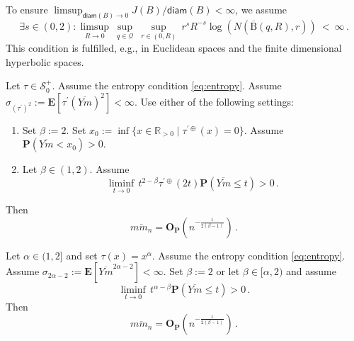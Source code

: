 \documentclass{article}
\newcommand*{\mc}[1]{\mathcal{#1}}
\newcommand{\R}{\mathbb{R}}
\newcommand{\Rpp}{\R_{>0}}
\newcommand{\ball}{\mathrm{B}}
\newcommand{\lb}{\left(} %
\newcommand{\rb}{\right)} %
\newcommand{\br}[1]{\lb #1 \rb} %
\newcommand{\brOf}[1]{\!\br{#1}} %
\renewcommand{\Pr}{\mathbf{P}} %
\newcommand{\Prof}[1]{\Pr(#1)}
\newcommand{\PrOf}[1]{\Pr\brOf{#1}}
\newcommand{\E}{\mathbf{E}} %
\newcommand{\Eof}[1]{\E[#1]}
\newcommand{\setByEleInText}[2]{\{#1 \mid #2\}}
\newcommand{\pr}{^\prime}
\newcommand{\eqfs}{\,.}
\newcommand{\ol}[2]{\overline{#1#2}}
\newcommand{\tran}{\tau}
\newcommand{\dtran}{\tau\pr}
\newcommand{\ddrtran}{\tau^{\prime\oplus}}
\newcommand{\setcciz}{\mc S_0^+}
\newcommand{\diam}{\mathsf{diam}}
\newcommand{\Op}{\mathbf{O}_{\Pr}}
\newcommand{\ballclosed}{\overline{\ball}}
\begin{document}
To ensure $\limsup_{\diam(B) \to 0}J(B)/\diam(B)<\infty$, we assume
\begin{equation}\label{eq:entropy}
    \exists s\in(0,2)\colon  
    \limsup_{R\to0} \ \sup_{q\in\mc Q} \ \sup_{r \in (0,R)} \  r^s R^{-s} \log\brOf{N(\ballclosed(q,R),r)} \ < \ \infty
    \eqfs
\end{equation}
This condition is fulfilled, e.g., in Euclidean spaces and the finite dimensional hyperbolic spaces.
%
\begin{theorem}\label{thm:fast:entropy}
    Let $\tran \in \setcciz$.
    Assume the entropy condition \eqref{eq:entropy}. 
    Assume $\sigma_{(\dtran)^2} := \Eof{\dtran(\ol Ym)^2} < \infty$.
    Use either of the following settings:
    \begin{enumerate}[label=(\roman*)]
        \item
        Set $\beta := 2$.
        Set $x_0 := \inf\setByEleInText{x\in\Rpp}{\ddrtran(x)=0}$.
        Assume $\Prof{\ol Ym < x_0} > 0$.
        \item 
        Let $\beta\in(1,2)$. Assume
        \begin{equation}\label{eq:smallball}
            \liminf_{t\to 0} \, t^{2-\beta} \ddrtran(2t) \PrOf{\ol Ym \leq t} > 0
            \eqfs
        \end{equation}
    \end{enumerate}
    Then
    \begin{equation}
        \ol{m}{m_n} = \Op\brOf{n^{-\frac{1}{2(\beta-1)}}}
        \eqfs
    \end{equation}
\end{theorem}
%
\begin{corollary}\label{cor:fast:entropy:power}
    Let $\alpha \in (1, 2]$ and set $\tran(x) = x^\alpha$.
    Assume the entropy condition \eqref{eq:entropy}. 
    Assume $\sigma_{2\alpha-2} := \Eof{\ol Ym^{2\alpha-2}} < \infty$.
    Set $\beta := 2$ or let $\beta\in[\alpha,2)$ and assume
    \begin{equation}\label{eq:smallball:alpha}
        \liminf_{t\to 0}  \, t^{\alpha-\beta} \PrOf{\ol Ym \leq t} > 0
        \eqfs
    \end{equation}
    Then
    \begin{equation}
        \ol{m}{m_n} = \Op\brOf{n^{-\frac{1}{2(\beta-1)}}}
        \eqfs
    \end{equation}
\end{corollary}
%
\end{document}
